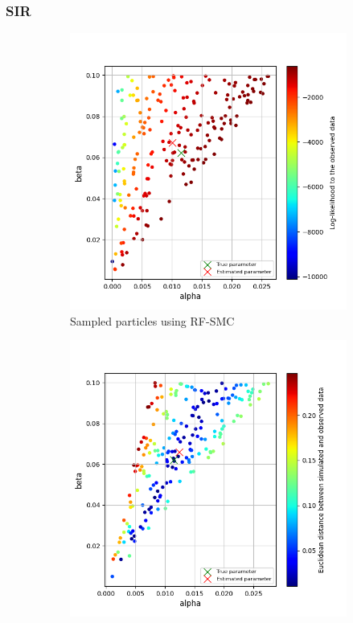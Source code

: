 \documentclass{beamer}
\begin{document}
\begin{frame}
    \frametitle{SIR}
    \begin{figure}[H]
        \centering
        \begin{subfigure}{0.48\textwidth}
            \centering
            \includegraphics[width=\linewidth]{figures/sir1510_rfsmc.png}
            \caption{Sampled particles using RF-SMC}
        \end{subfigure}
        \hfill
        \begin{subfigure}{0.48\textwidth}
            \centering
            \includegraphics[width=\linewidth]{figures/sir1510_abcsmc.png}

\end{subfigure}
\end{figure}
\end{frame}
\end{document}
